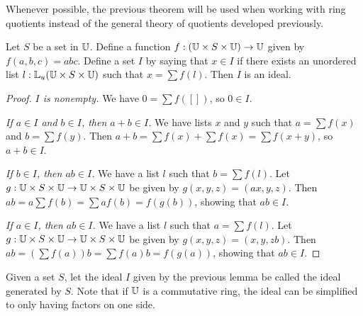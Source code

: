 \documentclass[../../math.tex]{subfiles}
\begin{document}
Whenever possible, the previous theorem will be used when working with ring
quotients instead of the general theory of quotients developed previously.

\begin{lemma}
    Let $S$ be a set in $\mathbb{U}$.  Define a function $f : (\mathbb{U} \times S \times \mathbb{U})
    \to \mathbb{U}$ given by $f(a, b, c) = abc$.  Define a set $I$ by saying that $x \in
    I$ if there exists an unordered list $l : \mathbb{L}_u(\mathbb{U} \times S \times \mathbb{U})$ such
    that $x = \sum f(l)$.  Then $I$ is an ideal.
\end{lemma}
\begin{proof}
    \textit{$I$ is nonempty.} We have $0 = \sum f([])$, so $0 \in I$.

    \textit{If $a \in I$ and $b \in I$, then $a + b \in I$.}  We have lists $x$
    and $y$ such that $a = \sum f(x)$ and $b = \sum f(y)$.  Then $a + b = \sum
    f(x) + \sum f(x) = \sum f(x + y)$, so $a + b \in I$.

    \textit{If $b \in I$, then $ab \in I$.}  We have a list $l$ such that $b =
    \sum f(l)$.  Let $g : \mathbb{U} \times S \times \mathbb{U} \to \mathbb{U} \times S \times \mathbb{U}$ be
    given by $g(x, y, z) = (ax, y, z)$.  Then $ab = a\sum f(b) = \sum af(b) =
    f(g(b))$, showing that $ab \in I$.

    \textit{If $a \in I$, then $ab \in I$.}  We have a list $l$ such that $a =
    \sum f(l)$.  Let $g : \mathbb{U} \times S \times \mathbb{U} \to \mathbb{U} \times S \times \mathbb{U}$ be
    given by $g(x, y, z) = (x, y, zb)$.  Then $ab = \left( \sum f(a) \right) b =
    \sum f(a)b = f(g(a))$, showing that $ab \in I$.
\end{proof}

\begin{definition}
    Given a set $S$, let the ideal $I$ given by the previous lemma be called the
    ideal generated by $S$.  Note that if $\mathbb{U}$ is a commutative ring, the ideal
    can be simplified to only having factors on one side.
\end{definition}
\end{document}

